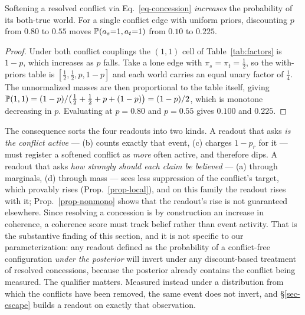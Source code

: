 \begin{proposition}
\label{prop-quirk}
Softening a resolved conflict via Eq.~\ref{eq-concession} \emph{increases} the probability of its
both-true world. For a single conflict edge with uniform priors, discounting $p$ from $0.80$ to
$0.55$ moves $\mathbb{P}\!\left( a_s{=}1,a_t{=}1 \right)$ from $0.10$ to $0.225$.
\end{proposition}
\begin{proof}
Under both conflict couplings the $(1,1)$ cell of Table~\ref{tab:factors} is $1-p$, which increases as
$p$ falls. Take a lone \con{} edge with $\pi_s=\pi_t=\tfrac12$, so the with-priors table is
$[\tfrac12,\tfrac12,p,1-p]$ and each world carries an equal unary factor of $\tfrac14$. The
unnormalized masses are then proportional to the table itself, giving
$\mathbb{P}\!\left( 1,1 \right)=(1-p)/\bigl(\tfrac12+\tfrac12+p+(1-p)\bigr)=(1-p)/2$, which is monotone decreasing in $p$.
Evaluating at $p=0.80$ and $p=0.55$ gives $0.100$ and $0.225$.
\end{proof}

The consequence sorts the four readouts into two kinds. A readout that asks \emph{is the conflict
active} --- (b) counts exactly that event, (c) charges $1-p_r$ for it --- must register a softened
conflict as \emph{more} often active, and therefore dips. A readout that asks \emph{how strongly
should each claim be believed} --- (a) through marginals, (d) through mass --- sees less suppression
of the conflict's target, which provably rises (Prop.~\ref{prop-local}), and on this family the
readout rises with it; Prop.~\ref{prop-nonmono} shows that the readout's rise is not guaranteed
elsewhere. Since resolving a concession is by construction an increase in coherence, a coherence
score must track belief rather than event activity. That is the substantive finding of this section,
and it is not specific to our parameterization: any readout defined as the probability of a
conflict-free configuration \emph{under the posterior} will invert under any discount-based
treatment of resolved concessions, because the posterior already contains the conflict being
measured. The qualifier matters. Measured instead under a distribution from which the conflicts have
been removed, the same event does not invert, and \S\ref{sec-escape} builds a readout on exactly
that observation.

